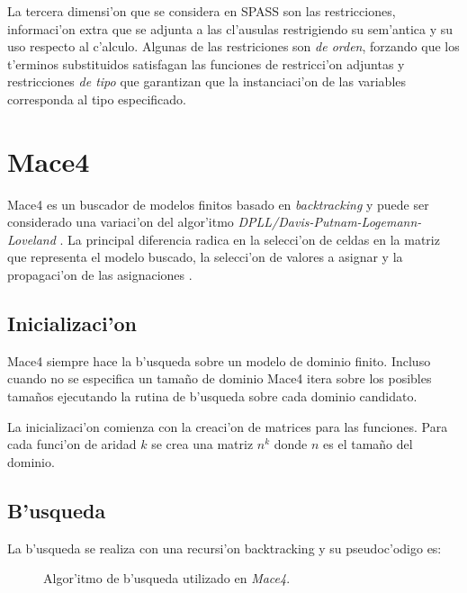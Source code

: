 La tercera dimensi'on que se considera en SPASS son las restricciones, informaci'on extra que se adjunta a las cl'ausulas restrigiendo su sem'antica y su uso respecto al c'alculo. Algunas de las restriciones son \textit{de orden}, forzando que los t'erminos substituidos satisfagan las funciones de restricci'on adjuntas y restricciones \textit{de tipo} que garantizan que la instanciaci'on de las variables corresponda al tipo especificado.


\section{Mace4}

Mace4 es un buscador de modelos finitos basado en \textit{backtracking} y puede ser considerado una variaci'on del algor'itmo \textit{DPLL/Davis-Putnam-Logemann-Loveland} \cite{dpll}. La principal diferencia radica en la selecci'on de celdas en la matriz que representa el modelo buscado, la selecci'on de valores a asignar y la propagaci'on de las asignaciones \cite{mace4_manual}.

\subsection{Inicializaci'on}

Mace4 siempre hace la b'usqueda sobre un modelo de dominio finito. Incluso cuando no se especifica un tamaño de dominio Mace4 itera sobre los posibles tamaños ejecutando la rutina de b'usqueda sobre cada dominio candidato.

La inicializaci'on comienza con la creaci'on de matrices para las funciones. Para cada funci'on de aridad $k$ se crea una matriz $n^k$ donde $n$ es el tamaño del dominio.

\subsection{B'usqueda}

La b'usqueda se realiza con una recursi'on backtracking y su pseudoc'odigo es:

\begin{figure}[htbp]
\caption{Algor'itmo de b'usqueda utilizado en \textit{Mace4}.}
\label{fig:mace4_busqueda}
\end{figure}

